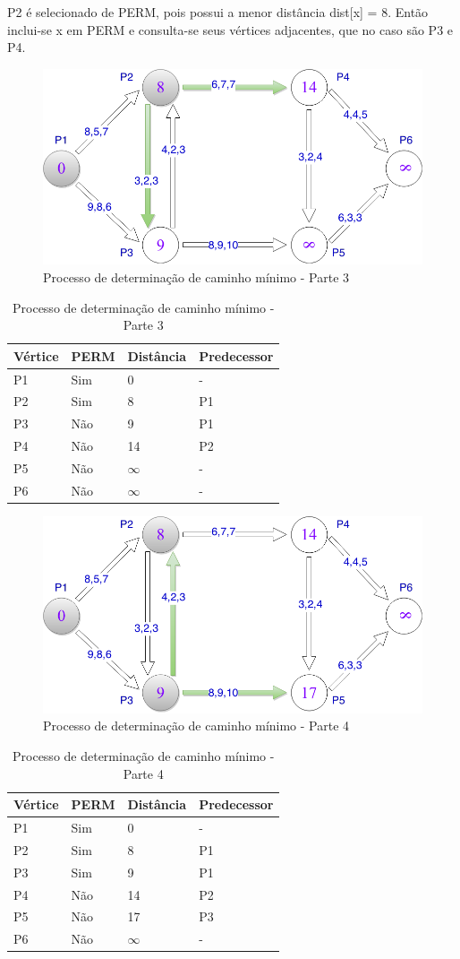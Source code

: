 P2 é selecionado de PERM, pois possui a menor distância dist[x] = 8. Então inclui-se x em PERM e consulta-se
seus vértices adjacentes, que no caso são P3 e P4.

\begin{figure}[htbp]
\centering
 \includegraphics[width=.50\textwidth]{chapters/fig/leo4.png}
\caption{Processo de determinação de caminho mínimo - Parte 3}
\label{fig:leo4}
\end{figure}
\FloatBarrier

\begin{table}[htbp]
	\centering
	\begin{tabular}{l l l l}
	\toprule
	Vértice & PERM & Distância & Predecessor\\
	\midrule
	P1 & Sim & 0 & - \\
	P2 & Sim & 8 & P1 \\
	P3 & Não & 9 & P1 \\
	P4 & Não & 14 & P2 \\
	P5 & Não & $\infty$ & - \\
	P6 & Não & $\infty$ & - \\
	\bottomrule
	\end{tabular}
\caption{Processo de determinação de caminho mínimo - Parte 3}
 \label{tab:leotab3}
\end{table}
\FloatBarrier

\begin{figure}[htbp]
\centering
 \includegraphics[width=.50\textwidth]{chapters/fig/leo5.png}
\caption{Processo de determinação de caminho mínimo - Parte 4}
\label{fig:leo5}
\end{figure}

\begin{table}[htbp]
	\centering
	\begin{tabular}{l l l l}
	\toprule
	Vértice & PERM & Distância & Predecessor\\
	\midrule
	P1 & Sim & 0 & - \\
	P2 & Sim & 8 & P1 \\
	P3 & Sim & 9 & P1 \\
	P4 & Não & 14 & P2 \\
	P5 & Não & 17 & P3 \\
	P6 & Não & $\infty$ & - \\
	\bottomrule
	\end{tabular}
\caption{Processo de determinação de caminho mínimo - Parte 4}
 \label{tab:leotab4}
\end{table}
\FloatBarrier

